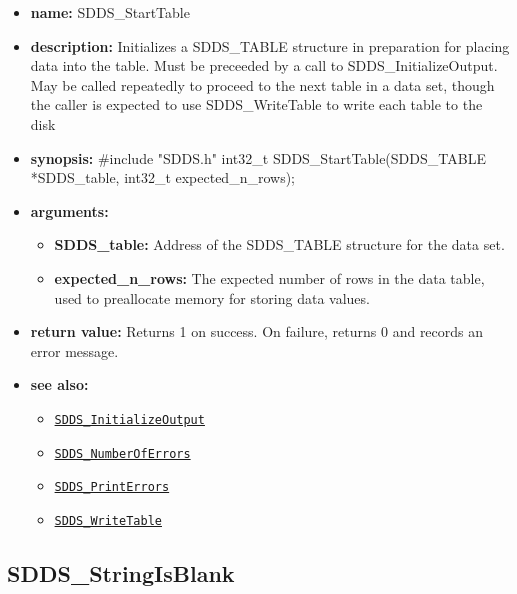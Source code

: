 \documentclass[11pt]{article}
\newcommand{\progref}[1]{\hyperref[SDDS_#1]{\tt SDDS\_#1}}
\begin{document}
\begin{itemize}
\item {\bf name:}\newline
SDDS\_StartTable
\item {\bf description:}\newline
Initializes a SDDS\_TABLE structure in preparation for placing data into the table. Must be preceeded by a call to SDDS\_InitializeOutput. May be called repeatedly to proceed to the next table in a data set, though the caller is expected to use SDDS\_WriteTable to write each table to the disk
\item {\bf synopsis:} \#include "SDDS.h"\newline
int32\_t SDDS\_StartTable(SDDS\_TABLE *SDDS\_table, int32\_t expected\_n\_rows);
\item {\bf arguments:}
\begin{itemize}
\item {\bf SDDS\_table:} Address of the SDDS\_TABLE structure for the data set.
\item {\bf expected\_n\_rows:} The expected number of rows in the data table, used to preallocate memory for storing data values.
\end{itemize}
\item {\bf return value:}\newline
Returns 1 on success. On failure, returns 0 and records an error message.
\item {\bf see also:}
\begin{itemize}
\item \progref{InitializeOutput}
\item \progref{NumberOfErrors}
\item \progref{PrintErrors}
\item \progref{WriteTable}
\end{itemize}
\end{itemize}

\subsection{SDDS\_StringIsBlank}
\label{SDDS_StringIsBlank}
\end{document}
